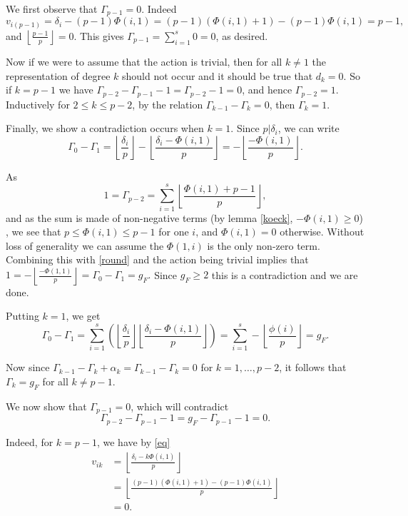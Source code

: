 We first observe that $\Gamma_{p-1} = 0$. Indeed
    \[
    v_{i(p-1)} = \delta_i - (p-1)\Phi(i,1) = (p-1)(\Phi(i,1) + 1) - (p-1)\Phi(i,1) = p-1,
    \]
and $\left \lfloor \frac{p-1}{p} \right\rfloor = 0$. This gives $\Gamma_{p-1} = \sum_{i=1}^s 0 = 0$, as desired.

Now if we were to assume that the action is trivial, then for all $k\neq 1$ the representation of degree $k$ should not occur and it should be true that $d_k = 0$.
So if $k= p-1$ we have $\Gamma_{p-2} - \Gamma_{p-1} - 1 = \Gamma_{p-2} -1 = 0$, and hence $\Gamma_{p-2} = 1$.
Inductively for $2\leq k \leq p-2$, by the relation $\Gamma_{k-1} - \Gamma_k =0$, then $\Gamma_k = 1$.

Finally, we show a contradiction occurs when $k = 1$.
Since $p| \delta_i$, we can write
    \begin{equation}\label{round}
    \Gamma_0 - \Gamma_1 = \left\lfloor \frac{\delta_i}{p} \right\rfloor -\left\lfloor \frac{\delta_i - \Phi(i,1)}{p} \right\rfloor = -\left\lfloor \frac{-\Phi(i,1)}{p} \right\rfloor.
    \end{equation}

As 
    \[
    1 = \Gamma_{p-2} = \sum_{i=1}^s\left\lfloor \frac{\Phi(i,1) + p -1}{p} \right\rfloor,
    \]
and as the sum is made of non-negative terms (by lemma \ref{koeck}, $-\Phi(i,1) \geq 0$) , we see that $p \leq \Phi(i,1) \leq p-1$ for one $i$, and $\Phi(i,1) = 0$ otherwise.
Without loss of generality we can assume the $\Phi(1,i)$ is the only non-zero term.
Combining this with \ref{round} and the action being trivial implies that $1 = -\left\lfloor \frac{-\Phi(1,1)}{p} \right\rfloor = \Gamma_0 - \Gamma_1 = g_F.$
Since $g_F \geq 2$ this is a contradiction and we are done.


\newpage


Putting $k=1$, we get 
    \[
    \Gamma_0 - \Gamma_1 = \sum_{i=1}^s\left(\left\lfloor \frac{\delta_i}{p} \right\rfloor \left\lfloor \frac{\delta_i - \Phi(i,1)}{p} \right\rfloor \right) = \sum_{i=1}^s - \left\lfloor \frac{\phi(i)}{p} \right\rfloor = g_F.
    \]

Now since $\Gamma_{k-1}-\Gamma_k+\alpha_k = \Gamma_{k-1}-\Gamma_k = 0$ for $k=1,\ldots ,p-2$, it follows that $\Gamma_k=g_F$ for all $k\neq p-1$.

We now show that $\Gamma_{p-1} = 0$, which will contradict
    \[
    \Gamma_{p-2} - \Gamma_{p-1} - 1 = g_F - \Gamma_{p-1} - 1 = 0.
    \]


Indeed, for $k = p-1$, we have by \ref{eq}
    \begin{align*}
    v_{ik} & =  \left \lfloor \frac{\delta_i - k\Phi(i,1)}{p} \right\rfloor \\
    & =  \left\lfloor \frac{(p-1)(\Phi(i,1) + 1) - (p-1)\Phi(i,1)}{p} \right\rfloor\\
    & =  0.
    \end{align*}



